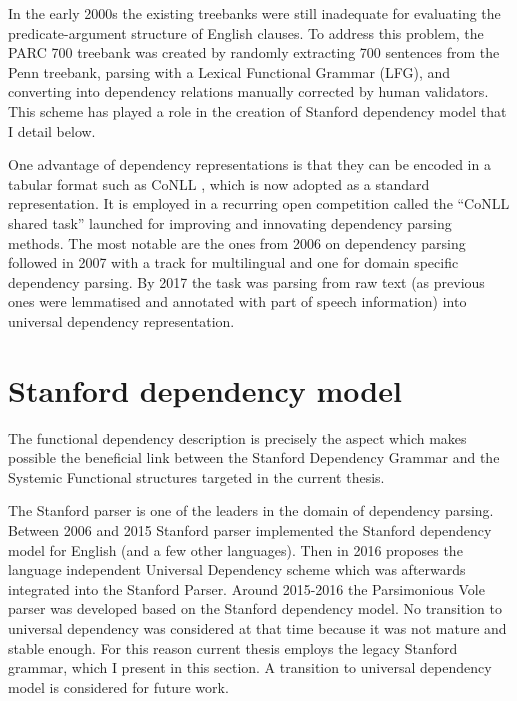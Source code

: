     In the early 2000s the existing treebanks were still inadequate for evaluating the predicate-argument structure of English clauses. To address this problem, the PARC 700 treebank \citep{King2003} was created by randomly extracting 700 sentences from the Penn treebank, parsing with a Lexical Functional Grammar (LFG), and converting into dependency relations manually corrected by human validators. This scheme has played a role in the creation of Stanford dependency model that I detail below. 

    One advantage of dependency representations is that they can be encoded in a tabular format such as CoNLL \citep{nivre2007conll}, which is now adopted as a standard representation. It is employed in a recurring open competition called the ``CoNLL shared task'' launched for improving and innovating dependency parsing methods. The most notable are the ones from 2006 on dependency parsing \citep{Buchholz2006} followed in 2007 with a track for multilingual and one for domain specific dependency parsing. By 2017 \citep{zeman2017conll} the task was parsing from raw text (as previous ones were lemmatised and annotated with part of speech information) into universal dependency representation.

\section{Stanford dependency model}
\label{sec:stanford-dependecy-grammar}
    The functional dependency description is precisely the aspect which makes possible the beneficial link between the Stanford Dependency Grammar and the Systemic Functional structures targeted in the current thesis. 

    The Stanford parser is one of the leaders in the domain of dependency parsing. Between 2006 and 2015 Stanford parser \citep{Marneffe2006} implemented the Stanford dependency model for English (and a few other languages). Then in 2016 \citet{Nivre2016ud} proposes the language independent Universal Dependency scheme which was afterwards integrated into the Stanford Parser. Around 2015-2016 the Parsimonious Vole parser was developed based on the Stanford dependency model. No transition to universal dependency was considered at that time because it was not mature and stable enough. For this reason current thesis employs the legacy Stanford grammar, which I present in this section. A transition to universal dependency model is considered for future work.

